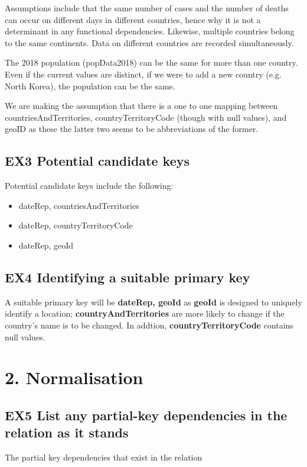 \documentclass{report}
\begin{document}
Assumptions include that the same number of cases and the number of deaths can occur on different days in different countries, hence why it is not a determinant in any functional dependencies. Likewise, multiple countries belong to the same continents. Data on different countries are recorded simultaneously.

The 2018 population (popData2018) can be the same for more than one country. Even if the current values are distinct, if we were to add a new country (e.g. North Korea), the population can be the same. 

We are making the assumption that there is a one to one mapping between countriesAndTerritories, countryTerritoryCode (though with null values), and geoID as these the latter two seems to be abbreviations of the former.

\vspace{0.2cm}

\subsection*{EX3 Potential candidate keys}
Potential candidate keys include the following:
\begin{itemize}
    \item dateRep, countriesAndTerritories 
    \item dateRep, countryTerritoryCode
    \item dateRep, geoId 
\end{itemize}

\vspace{0.2cm}
\subsection*{EX4 Identifying a suitable primary key }
A suitable primary key will be \textbf{dateRep, geoId} as \textbf{geoId} is designed to uniquely identify a location; \textbf{countryAndTerritories} are more likely to change if the country's name is to be changed. In addtion, \textbf{countryTerritoryCode} contains null values.
\vspace{2mm}

\section*{2. Normalisation}
\subsection*{EX5 List any partial-key dependencies in the relation as it stands}
The partial key dependencies that exist in the relation 
\end{document}
